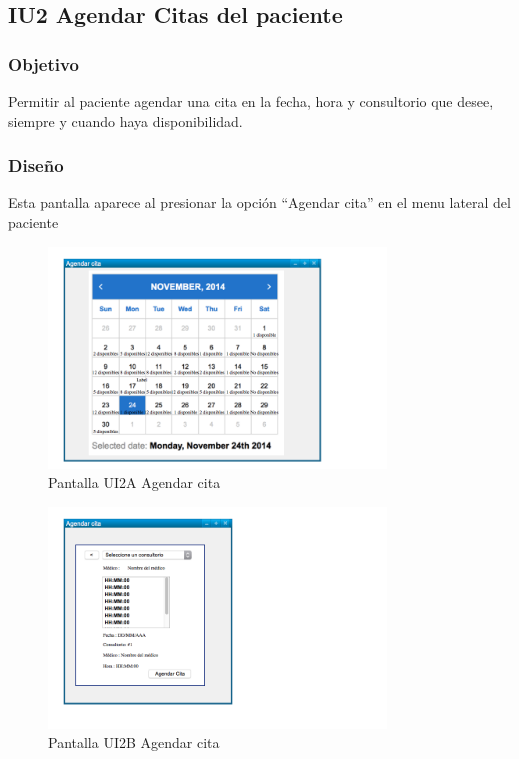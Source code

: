 \subsection{IU2 Agendar Citas del paciente}

\subsubsection{Objetivo}
Permitir al paciente agendar una cita en la fecha, hora y consultorio que desee, siempre y cuando haya disponibilidad.

\subsubsection{Diseño}
Esta pantalla aparece al presionar la opción ``Agendar cita'' en el menu lateral del paciente

\begin{figure}[htbp!]
    \centering
        \includegraphics[width=0.8\textwidth]{images/UI2A}
    \caption{Pantalla UI2A Agendar cita}
\end{figure}

\begin{figure}[htbp!]
    \centering
        \includegraphics[width=0.8\textwidth]{images/UI2B}
    \caption{Pantalla UI2B Agendar cita}
\end{figure}

